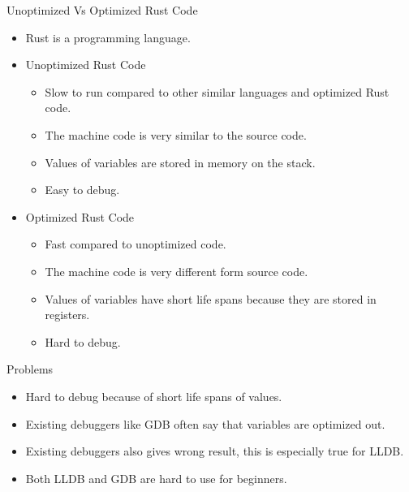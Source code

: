 \begin{frame}{Unoptimized Vs Optimized Rust Code}
	\begin{itemize}
		\item Rust is a programming language.
    \item Unoptimized Rust Code
	    \begin{itemize}
        \item Slow to run compared to other similar languages and optimized Rust code.
        \item The machine code is very similar to the source code.
        \item Values of variables are stored in memory on the stack.
        \item Easy to debug.
	    \end{itemize}
    \item Optimized Rust Code
	    \begin{itemize}
        \item Fast compared to unoptimized code.
        \item The machine code is very different form source code.
        \item Values of variables have short life spans because they are stored in registers.
        \item Hard to debug.
	    \end{itemize}
	\end{itemize}
\end{frame}


\begin{frame}{Problems}
	\begin{itemize}
		\item Hard to debug because of short life spans of values.
		\item Existing debuggers like GDB often say that variables are optimized out.
		\item Existing debuggers also gives wrong result, this is especially true for LLDB.
		\item Both LLDB and GDB are hard to use for beginners.
	\end{itemize}
\end{frame}


